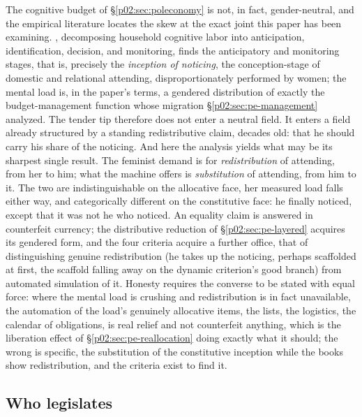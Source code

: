 \documentclass[11pt,a4paper]{article}
\begin{document}
The cognitive budget of \S\ref{p02:sec:poleconomy} is not, in fact, gender-neutral, and the empirical literature locates the skew at the exact joint this paper has been examining. \textcite{daminger2019cognitive}, decomposing household cognitive labor into anticipation, identification, decision, and monitoring, finds the anticipatory and monitoring stages, that is, precisely the \emph{inception of noticing}, the conception-stage of domestic and relational attending, disproportionately performed by women; the mental load is, in the paper's terms, a gendered distribution of exactly the budget-management function whose migration \S\ref{p02:sec:pe-management} analyzed. The tender tip therefore does not enter a neutral field. It enters a field already structured by a standing redistributive claim, decades old: that he should carry his share of the noticing. And here the analysis yields what may be its sharpest single result. The feminist demand is for \emph{redistribution} of attending, from her to him; what the machine offers is \emph{substitution} of attending, from him to it. The two are indistinguishable on the allocative face, her measured load falls either way, and categorically different on the constitutive face: he finally noticed, except that it was not he who noticed. An equality claim is answered in counterfeit currency; the distributive reduction of \S\ref{p02:sec:pe-layered} acquires its gendered form, and the four criteria acquire a further office, that of distinguishing genuine redistribution (he takes up the noticing, perhaps scaffolded at first, the scaffold falling away on the dynamic criterion's good branch) from automated simulation of it. Honesty requires the converse to be stated with equal force: where the mental load is crushing and redistribution is in fact unavailable, the automation of the load's genuinely allocative items, the lists, the logistics, the calendar of obligations, is real relief and not counterfeit anything, which is the liberation effect of \S\ref{p02:sec:pe-reallocation} doing exactly what it should; the wrong is specific, the substitution of the constitutive inception while the books show redistribution, and the criteria exist to find it.

\subsection{Who legislates}
\label{p02:sec:fem-legislates}
\end{document}
